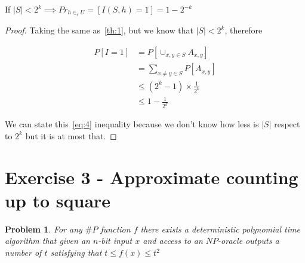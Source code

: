 \documentclass[12pt, a4paper]{article}
\begin{document}
\begin{2k}
  If $|S| < 2^k \implies Pr_{h \in_r U} = \left[ I(S,h) = 1 \right] = 1 - 2^{-k}$
\end{2k}

\begin{proof}
  Taking the same as~\ref{th:1}, but we know that $|S| < 2^k$, therefore

  \begin{subequations}
    \begin{align}
      P[I =  1] &= P \left[ \cup_{x,y \in S} A_{x,y} \right]\\
      &= \sum_{x \neq y \in S} P[A_{x,y}] \\
      &\leq (2^k - 1) \times \frac{1}{2^k}\label{eq:4}\\
      &\leq 1 - \frac{1}{2^k}
    \end{align}
  \end{subequations}

  We can state this~\ref{eq:4} inequality because we don't know how less is $|S|$ respect to $2^k$ but it is at most that.
\end{proof}

\section{Exercise 3 - Approximate counting up to square}
\newtheorem{a-counting}{Problem}
\begin{a-counting}
  For any $\#P$ function $f$ there exists a \textit{deterministic} polynomial time algorithm that given an $n$-bit input $x$ and access to an $NP$-oracle outputs a number of $t$ satisfying that $t \leq f(x) \leq t^2$
\end{a-counting}
\end{document}
